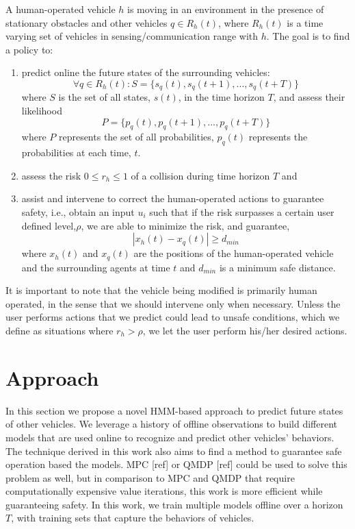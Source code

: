 \documentclass[conference]{IEEEtran}
\newcommand\NB[1]{$\spadesuit$\footnote{NB: #1}}
\begin{document}
    A human-operated vehicle $h$ is moving in an environment in the presence of stationary obstacles and other vehicles $q \in R_h(t)$, where $R_h(t)$ is a time varying set of vehicles in sensing/communication range with $h$. The goal is to find a policy to:
    \begin{enumerate}
        \item  predict online the future states of the surrounding vehicles:
    \begin{equation}
    \forall q \in R_h(t): S=\{{s_q(t), s_q(t+1),..., s_q(t+T)}\}
    \end{equation}
     where $S$ is the set of all states, $s(t)$, in the time horizon $T$, and assess their likelihood
    \begin{equation}
    P=\{{p_q(t), p_q(t+1),..., p_q(t+T)}\}
    \end{equation}
    where $P$ represents the set of all probabilities, $p_q(t)$ represents the probabilities at each time, $t$.
    \item assess the risk $0\leq r_h \leq1$ of a collision during time horizon $T$ and
    \item assist and intervene to correct the human-operated actions to guarantee safety, i.e., obtain an input $u_i$ such that if the risk surpasses a certain user defined level,$\rho$, we are able to minimize the risk, and guarantee,
    \begin{equation}
        |x_h(t)-x_q(t)| \geq d_{min}
    \end{equation}
     where $x_h(t)$ and $x_q(t)$ are the positions of the human-operated vehicle and the surrounding agents at time $t$ and $d_{min}$ is a minimum safe distance.
    \end{enumerate}
    
    It is important to note that the vehicle being modified is primarily human operated, in the sense that we should intervene only when necessary. Unless the user performs actions that we predict could lead to unsafe conditions, which we define as situations where $r_h>\rho$, we let the user perform his/her desired actions.

\section{Approach}

In this section we propose a novel HMM-based approach to predict future states of other vehicles. We leverage a history of offline observations to build different models that are used online to recognize and predict other vehicles' behaviors. The technique derived in this work also aims to find a method to guarantee safe operation based the models. %
MPC [ref] or QMDP [ref] could be used to solve this problem as well, but in comparison to MPC and QMDP that require computationally expensive value iterations, this work is more efficient while guaranteeing safety. In this work, we train multiple models offline over a horizon $T$, with training sets that capture the behaviors of vehicles.
\end{document}
